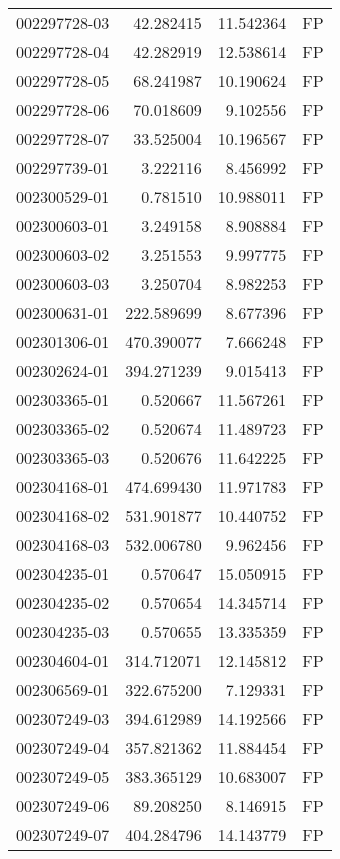\begin{tabular}{lrrl}
002297728-03 &   42.282415 &    11.542364 &   FP \\
002297728-04 &   42.282919 &    12.538614 &   FP \\
002297728-05 &   68.241987 &    10.190624 &   FP \\
002297728-06 &   70.018609 &     9.102556 &   FP \\
002297728-07 &   33.525004 &    10.196567 &   FP \\
002297739-01 &    3.222116 &     8.456992 &   FP \\
002300529-01 &    0.781510 &    10.988011 &   FP \\
002300603-01 &    3.249158 &     8.908884 &   FP \\
002300603-02 &    3.251553 &     9.997775 &   FP \\
002300603-03 &    3.250704 &     8.982253 &   FP \\
002300631-01 &  222.589699 &     8.677396 &   FP \\
002301306-01 &  470.390077 &     7.666248 &   FP \\
002302624-01 &  394.271239 &     9.015413 &   FP \\
002303365-01 &    0.520667 &    11.567261 &   FP \\
002303365-02 &    0.520674 &    11.489723 &   FP \\
002303365-03 &    0.520676 &    11.642225 &   FP \\
002304168-01 &  474.699430 &    11.971783 &   FP \\
002304168-02 &  531.901877 &    10.440752 &   FP \\
002304168-03 &  532.006780 &     9.962456 &   FP \\
002304235-01 &    0.570647 &    15.050915 &   FP \\
002304235-02 &    0.570654 &    14.345714 &   FP \\
002304235-03 &    0.570655 &    13.335359 &   FP \\
002304604-01 &  314.712071 &    12.145812 &   FP \\
002306569-01 &  322.675200 &     7.129331 &   FP \\
002307249-03 &  394.612989 &    14.192566 &   FP \\
002307249-04 &  357.821362 &    11.884454 &   FP \\
002307249-05 &  383.365129 &    10.683007 &   FP \\
002307249-06 &   89.208250 &     8.146915 &   FP \\
002307249-07 &  404.284796 &    14.143779 &   FP \\

\end{tabular}
